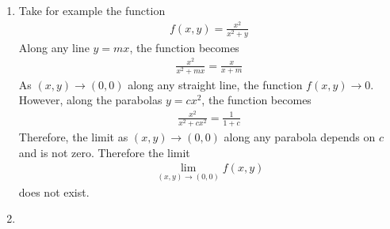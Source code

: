 \documentclass{article}
\begin{document}
\begin{enumerate}
\item 
Take for example the function
\begin{align*}
f(x,y) = \frac{x^2}{x^2+y}
\end{align*}
Along any line $y = mx$, the function becomes
\begin{align*}
\frac{x^2}{x^2+mx} = \frac{x}{x+m}
\end{align*}
As $(x,y) \rightarrow (0,0)$ along any straight line, the function $f(x,y) \rightarrow 0$. However, along the parabolas $y=cx^2$, the function becomes
\begin{align*}
\frac{x^2}{x^2+cx^2} = \frac{1}{1 + c}
\end{align*}
Therefore, the limit as $(x,y) \rightarrow (0,0)$ along any parabola depends on $c$ and is not zero. Therefore the limit 
\begin{align*}
\lim_{(x,y) \rightarrow (0,0)} f(x,y)
\end{align*}
does not exist. 

\item


\end{enumerate}
\end{document}
